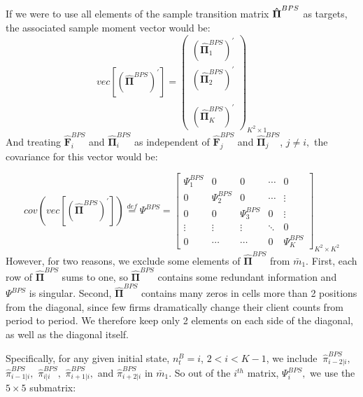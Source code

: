 \documentclass[12pt]{article} \usepackage{amsmath,amssymb,amsthm,geometry,graphicx,setspace,algorithm,algpseudocode,float}
\begin{document}
If we were to use all elements of the sample transition matrix $\mathbf{\hat{%
\Pi}}^{BPS}$ as targets, the associated sample moment vector would be:%
\begin{equation*}
vec\left[ \left( \mathbf{\hat{\Pi}}^{BPS}\right) ^{\prime }\right] =\left( 
\begin{array}{c}
\left( \mathbf{\hat{\Pi}}_{1}^{BPS}\right) ^{\prime } \\ 
\left( \mathbf{\hat{\Pi}}_{2}^{BPS}\right) ^{\prime } \\ 
\\ 
\\ 
\left( \mathbf{\hat{\Pi}}_{K}^{BPS}\right) ^{\prime }%
\end{array}%
\right) _{K^{2}\times 1}
\end{equation*}%
And treating $\mathbf{\hat{F}}_{i}^{BPS}$ and $\mathbf{\hat{\Pi}}_{i}^{BPS}$%
as independent of $\mathbf{\hat{F}}_{j}^{BPS}$ and $\mathbf{\hat{\Pi}}%
_{j}^{BPS}$, $j\neq i,$ the covariance for this vector would be:

\begin{equation*}
cov\left( vec\left[ \left( \mathbf{\hat{\Pi}}^{BPS}\right) ^{\prime }\right]
\right) \overset{def}{=}\Psi ^{BPS}=\left[ 
\begin{array}{ccccc}
\Psi _{1}^{BPS} & 0 & 0 & \cdots  & 0 \\ 
0 & \Psi _{2}^{BPS} & 0 & \cdots  & \vdots  \\ 
0 & 0 & \Psi _{3}^{BPS} & 0 & \vdots  \\ 
\vdots  & \vdots  & \vdots  & \ddots  & 0 \\ 
0 & \cdots  & \cdots  & 0 & \Psi _{K}^{BPS}%
\end{array}%
\right] _{K^{2}\times K^{2}}
\end{equation*}%
However, for two reasons, we exclude some elements of $\mathbf{\hat{\Pi}}%
^{BPS}$ from $\bar{m}_{1}$. First, each row of $\mathbf{\hat{\Pi}}^{BPS}$
sums to one, so $\mathbf{\hat{\Pi}}^{BPS}$ contains some redundant
information and $\Psi ^{BPS}$ is singular. Second, $\mathbf{\hat{\Pi}}^{BPS}$
contains many zeros in cells more than 2 positions from the diagonal,
since few firms dramatically change their client counts from period to
period. We therefore keep only 2 elements on each side of the diagonal, as
well as the diagonal itself.

Specifically, for any given initial state, $n_{t}^{B}=i$, $2<i<K-1$, we
include $\ \hat{\pi}_{i-2|i}^{BPS},$ $\hat{\pi}_{i-1|i}^{BPS},$ $\hat{\pi}%
_{i|i}^{BPS},$ $\hat{\pi}_{i+1|i}^{BPS},$ and $\hat{\pi}_{i+2|i}^{BPS}$ in $%
\bar{m}_{1}.$ So out of the $i^{th}$ matrix, $\Psi _{i}^{BPS},$ we use the $%
5\times 5$ submatrix:
\end{document}
